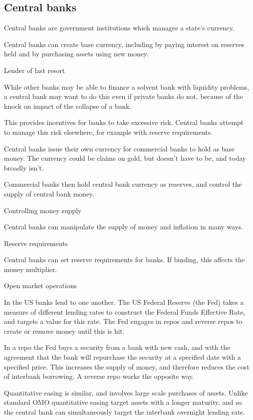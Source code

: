 
\subsection{Central banks}

Central banks are government institutions which manages a state’s currency.

Central banks can create base currency, including by paying interest on reserves held and by purchasing assets using new money.

Lender of last resort

While other banks may be able to finance a solvent bank with liquidity problems, a central bank may want to do this even if private banks do not, because of the knock on impact of the collapse of a bank.

This provides incentives for banks to take excessive risk. Central banks attempt to manage this risk elsewhere, for example with reserve requirements.

Central banks issue their own currency for commercial banks to hold as base money. The currency could be claims on gold, but doesn’t have to be, and today broadly isn’t.

Commercial banks then hold central bank currency as reserves, and control the supply of central bank money.

Controlling money supply

Central banks can manipulate the supply of money and inflation in many ways.

Reserve requirements

Central banks can set reserve requirements for banks. If binding, this affects the money multiplier.

Open market operations

In the US banks lend to one another. The US Federal Reserve (the Fed) takes a measure of different lending rates to construct the Federal Funds Effective Rate, and targets a value for this rate. The Fed engages in repos and reverse repos to create or remove money until this is hit.

In a repo the Fed buys a security from a bank with new cash, and with the agreement that the bank will repurchase the security at a specified date with a specified price. This increases the supply of money, and therefore reduces the cost of interbank borrowing. A reverse repo works the opposite way.

Quantitative easing is similar, and involves large scale purchases of assets. Unlike standard OMO quantitative easing target assets with a longer maturity, and so the central bank can simultaneously target the interbank overnight lending rate.

